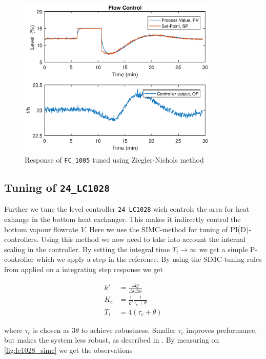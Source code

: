 \begin{figure}[ht!]
	\centering
	\includegraphics[width=0.85\textwidth]{fig/tuning/FC1005_tuned.eps}
	\caption{Response of \texttt{FC\_1005} tuned using Ziegler-Nichols method}
	\label{fig:fc1005_tuned}
\end{figure}

\subsection{Tuning of \texttt{24\_LC1028}}
Further we tune the level controller \texttt{24\_LC1028} wich controls the area for heat exhange in the bottom heat exchanger. This makes it indirectly control the bottom vapour flowrate $V$. Here we use the SIMC-method for tuning of PI(D)-controllers. Using this method we now need to take into account the internal scaling in the controller. By setting the integral time $T_i \to\infty$ we get a simple P-controller which we apply a step in the reference. By using the SIMC-tuning rules from \cite{skogestad2005multivariable} applied on a integrating step response we get

\begin{equation}\label{eq:simc}
	\begin{aligned}
		k' &= \frac{\Delta y}{\Delta t \Delta u}\\
		K_c &= \frac{1}{k'}\frac{1}{\tau_c + \theta} \\
		T_i &= 4(\tau_c + \theta)
	\end{aligned}
\end{equation}

where $\tau_c$ is chosen as $3\theta$ to achieve robustness. Smaller $\tau_c$ improves preformance, but makes the system less robust, as described in \cite{skogestad2005multivariable}. By measuring on \autoref{fig:lc1028_simc} we get the observations

